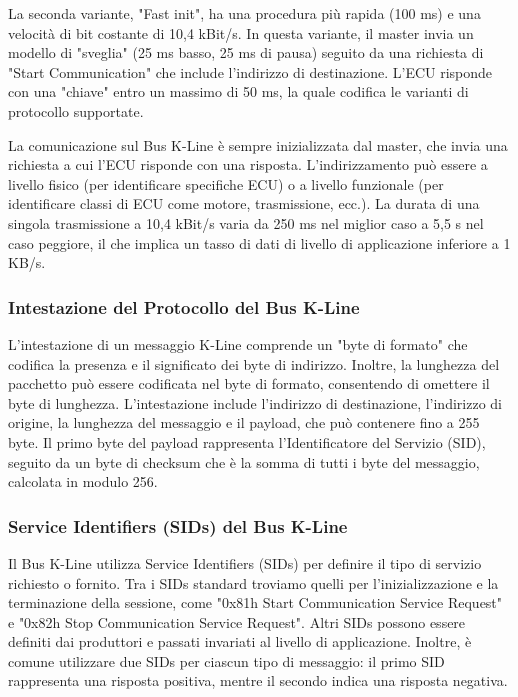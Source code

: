La seconda variante, "Fast init", ha una procedura più rapida (100 ms) e una velocità di bit costante di 10,4 kBit/s. In questa variante, il master invia un modello di "sveglia" (25 ms basso, 25 ms di pausa) seguito da una richiesta di "Start Communication" che include l'indirizzo di destinazione. L'ECU risponde con una "chiave" entro un massimo di 50 ms, la quale codifica le varianti di protocollo supportate.

La comunicazione sul Bus K-Line è sempre inizializzata dal master, che invia una richiesta a cui l'ECU risponde con una risposta. L'indirizzamento può essere a livello fisico (per identificare specifiche ECU) o a livello funzionale (per identificare classi di ECU come motore, trasmissione, ecc.). La durata di una singola trasmissione a 10,4 kBit/s varia da 250 ms nel miglior caso a 5,5 s nel caso peggiore, il che implica un tasso di dati di livello di applicazione inferiore a 1 KB/s.

\subsubsection{Intestazione del Protocollo del Bus K-Line}

L'intestazione di un messaggio K-Line comprende un "byte di formato" che codifica la presenza e il significato dei byte di indirizzo. Inoltre, la lunghezza del pacchetto può essere codificata nel byte di formato, consentendo di omettere il byte di lunghezza. L'intestazione include l'indirizzo di destinazione, l'indirizzo di origine, la lunghezza del messaggio e il payload, che può contenere fino a 255 byte. Il primo byte del payload rappresenta l'Identificatore del Servizio (SID), seguito da un byte di checksum che è la somma di tutti i byte del messaggio, calcolata in modulo 256.

\subsubsection{Service Identifiers (SIDs) del Bus K-Line}

Il Bus K-Line utilizza Service Identifiers (SIDs) per definire il tipo di servizio richiesto o fornito. Tra i SIDs standard troviamo quelli per l'inizializzazione e la terminazione della sessione, come "0x81h Start Communication Service Request" e "0x82h Stop Communication Service Request". Altri SIDs possono essere definiti dai produttori e passati invariati al livello di applicazione. Inoltre, è comune utilizzare due SIDs per ciascun tipo di messaggio: il primo SID rappresenta una risposta positiva, mentre il secondo indica una risposta negativa.

